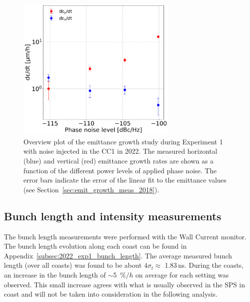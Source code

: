 \begin{figure}[!h] 
     \centering         
   \includegraphics[width=0.7\textwidth]{images/Ch8/emit_H_and_V_noise_scan.png}
       \caption{Overview plot of the emittance growth study during Experiment 1 with noise injected in the CC1 in 2022. The measured horizontal (blue) and vertical (red) emittance growth rates are shown as a function of the different power levels of applied phase noise. The error bars indicate the error of the linear fit to the emittance values (see Section~\ref{sec:emit_growth_meas_2018}).}
       \label{fig:H_V_emit_growth_noise_scan}
\end{figure}

\subsection{Bunch length and intensity measurements}\label{sec:bunch_length_intensity_2022}

The bunch length measurements were performed with the Wall Current monitor. The bunch length evolution along each coast can be found in Appendix~\ref{subsec:2022_exp1_bunch_length}. The average measured bunch length (over all coasts) was found to be about $4\sigma_t \approx $ 1.83\,ns. During the coasts, an increase in the bunch length of $\sim$5~$\%/h$ on average for each setting was observed. This small increase agrees with what is usually observed in the SPS in coast and will not be taken into consideration in the following analysis. 



